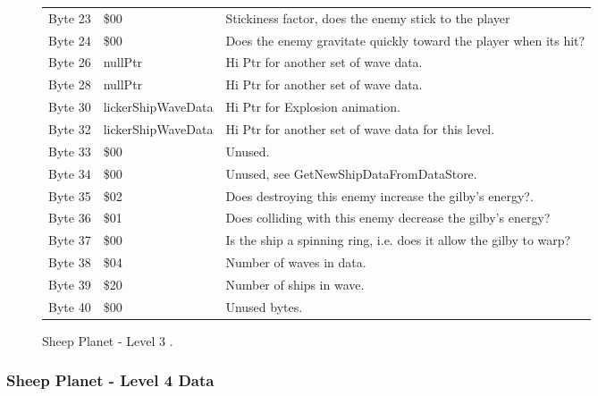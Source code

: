 \begin{figure}[H]
{\begin{adjustbox}{width=12cm}
\begin{tabular}{lll}
 Byte 23 & \$00                       & Stickiness factor, does the enemy stick to the player              \\
 Byte 24 & \$00                       & Does the enemy gravitate quickly toward the player when its hit?   \\
 Byte 26 & nullPtr                   & Hi Ptr for another set of wave data.                               \\
 Byte 28 & nullPtr                   & Hi Ptr for another set of wave data.                               \\
 Byte 30 & lickerShipWaveData        & Hi Ptr for Explosion animation.                                    \\
 Byte 32 & lickerShipWaveData        & Hi Ptr for another set of wave data for this level.                \\
 Byte 33 & \$00                       & Unused.                                                            \\
 Byte 34 & \$00                       & Unused, see GetNewShipDataFromDataStore.                           \\
 Byte 35 & \$02                       & Does destroying this enemy increase the gilby's energy?.           \\
 Byte 36 & \$01                       & Does colliding with this enemy decrease the gilby's energy?        \\
 Byte 37 & \$00                       & Is the ship a spinning ring, i.e. does it allow the gilby to warp? \\
 Byte 38 & \$04                       & Number of waves in data.                                           \\
 Byte 39 & \$20                       & Number of ships in wave.                                           \\
 Byte 40 & \$00                       & Unused bytes.                                                      \\
\bottomrule
\end{tabular}

  \end{adjustbox}

  }\caption*{Sheep Planet - Level 3
.}
\end{figure}

\clearpage
\subsubsection{Sheep Planet - Level 4 Data}

